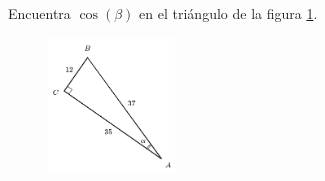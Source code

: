 Encuentra $\cos(\beta)$ en el triángulo de la figura \ref{fig:functrig04}.
\begin{figure}[H]
    \begin{center}
        \includegraphics[width=0.3\textwidth]{../images/functrig04.png}
    \end{center}
    \caption{}
    \label{fig:functrig04}
\end{figure}
